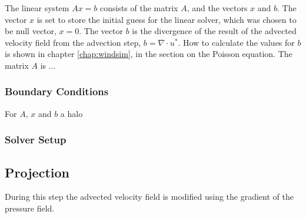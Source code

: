 The linear system $Ax = b$ consists of the matrix $A$, and the vectors $x$ and
$b$. The vector $x$ is set to store the initial guess for the linear solver,
which was chosen to be null vector, $x = 0$. The vector $b$ is the divergence of
the result of the advected velocity field from the advection step, $b = \nabla
\cdot u^*$. How to calculate the values for $b$ is shown in chapter 
\ref{chap:windsim}, in the section on the Poisson equation. The matrix $A$ is
...

\subsubsection{Boundary Conditions}

For $A$, $x$ and $b$ a halo 


\subsubsection{Solver Setup}

\subsection{Projection}

During this step the advected velocity field is modified using the gradient of
the pressure field. 
